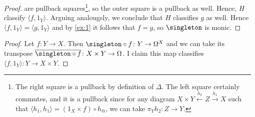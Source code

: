 \begin{exercise}{2}
\begin{solution}
\begin{solutions}
\begin{proof}
                are pullback squares\footnote{
                    The right square is a pullback by definition of $\Delta$. The left square certainly commutes, and it is a pullback since for any diagram $X\times Y\xleftarrow{h_2} Z\xrightarrow{h_1} X$ such that $\langle h_1, h_1\rangle=(1_X\times f)\circ h_@$, we can take $\pi_Yh_2\colon Z\to Y$.
                }, so the outer square is a pullback as well. Hence, $H$ classify $\langle f, 1_Y\rangle$. Arguing analougsly, we conclude that $H$ classifies $g$ as well. Hence $\langle f, 1_Y\rangle = \langle g, 1_Y\rangle$ and by \ref{ex:1} it follows that $f=g$, so $\singleton$ is monic. 
            \end{proof}
            \item\begin{proof}
                Let $f\colon Y\to X$. Then $\singleton\circ f\colon Y\to\Omega^X$ and we can take its transpose $\overline{\singleton\circ f}\colon X\times Y\to\Omega$. I claim this map classifies $\langle f, 1_Y\rangle\colon Y\to X\times Y$. 
            \end{proof}
        \end{solutions}
    \end{solution}
\end{exercise}

